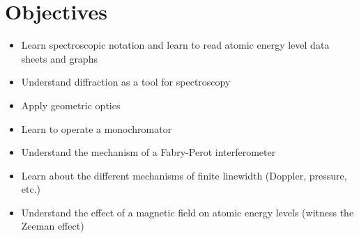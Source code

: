 \documentclass{../lab}
\begin{document}
\section{Objectives}

\begin{itemize}
    \item Learn spectroscopic notation and learn to read atomic energy level data sheets and graphs

    \item Understand diffraction as a tool for spectroscopy

    \item Apply geometric optics

    \item Learn to operate a monochromator

    \item Understand the mechanism of a Fabry-Perot interferometer

    \item Learn about the different mechanisms of finite linewidth (Doppler, pressure, etc.)

    \item Understand the effect of a magnetic field on atomic energy levels (witness the Zeeman effect)

\end{itemize}



\end{document}
